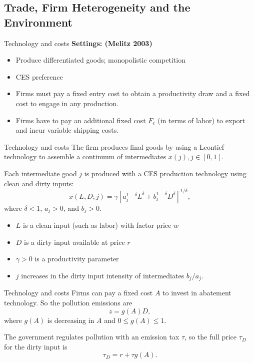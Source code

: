 \documentclass{beamer}
\begin{document}
\subsection{Trade, Firm Heterogeneity and the Environment}
\begin{frame}[shrink]
	\transfade %
	\tableofcontents[sectionstyle=show/shaded,subsectionstyle=show/shaded/hide]
	\addtocounter{framenumber}{-1}
\end{frame}
\begin{frame}{Technology and costs}
	\textbf{Settings: (Melitz 2003)}
	\begin{itemize}
		\item Produce differentiated goods; monopolistic competition
		\item CES preference
		\item Firms must pay a fixed entry cost to obtain a productivity draw and a fixed cost to engage in any production.
		\item Firms have to pay an additional fixed cost $F_e$ (in terms of labor) to export and incur variable shipping costs.
	\end{itemize}
\end{frame}
\begin{frame}{Technology and costs}
	The firm produces final goods by using a Leontief technology to assemble a continuum of intermediates $x(j),j\in[0,1]$.
	\medskip

	Each intermediate good $j$ is produced with a CES production technology using clean and dirty inputs:
	\begin{equation}
		x(L,D;j)=\gamma[a_j^{1-\delta}L^\delta+b_j^{1-\delta}D^\delta]^{1/\delta},
	\end{equation}
	where $\delta<1$, $a_j>0$, and $b_j>0$.
	\begin{itemize}
		\item $L$ is a clean input (such as labor) with factor price $w$
		\item $D$ is a dirty input available at price $r$
		\item $\gamma>0$ is a productivity parameter
		\item $j$ increases in the dirty input intensity of intermediates $b_j/a_j$.
	\end{itemize}
\end{frame}
\begin{frame}{Technology and costs}
	Firms can pay a fixed cost $A$ to invest in abatement technology. So the pollution emissions are
	\begin{equation}
		z=g(A)D,
	\end{equation}
	where $g(A)$ is decreasing in $A$ and $0\leq g(A)\leq 1$.
	\medskip

	The government regulates pollution with an emission tax $\tau$, so the full price $\tau_D$ for the dirty input is
	\begin{equation}
		\tau_D=r+\tau g(A).
	\end{equation}
\end{frame}
\end{document}
